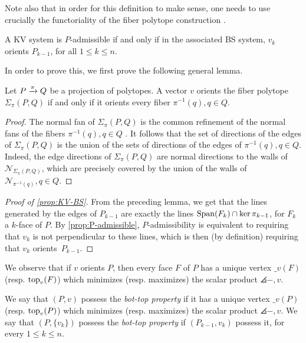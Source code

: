 Note also that in order for this definition to make sense, one needs to use crucially the functoriality of the fiber polytope construction \cite[Lemma 2.3]{BilleraSturmfels92}.

\begin{proposition}
\label{prop:KV-BS}
    A KV system is $P$-admissible if and only if in the associated BS system, $v_k$ orients $P_{k-1}$, for all $1\leq k \leq n$.
\end{proposition}

In order to prove this, we first prove the following general lemma.

\begin{lemma}
    Let $P \xrightarrow{\pi} Q$ be a projection of polytopes. 
    A vector $v$ orients the fiber polytope $\Sigma_\pi(P,Q)$ if and only if it orients every fiber $\pi^{-1}(q), q \in Q$. 
\end{lemma}

\begin{proof}
    The normal fan of $\Sigma_\pi(P,Q)$ is the common refinement of the normal fans of the fibers $\pi^{-1}(q), q \in Q$ \cite[Proposition 2.2]{BilleraSturmfels94}.
    It follows that the set of directions of the edges of $\Sigma_\pi(P,Q)$ is the union of the sets of directions of the edges of $\pi^{-1}(q), q \in Q$. 
    Indeed, the edge directions of $\Sigma_\pi(P,Q)$ are normal directions to the walls of $\mathcal{N}_{\Sigma_\pi(P,Q)}$, which are precisely covered by the union of the walls of $\mathcal{N}_{\pi^{-1}(q)}, q \in Q$. 
\end{proof}

\begin{proof}[Proof of \cref{prop:KV-BS}]
    From the preceding lemma, we get that the lines generated by the edges of $P_{k-1}$ are exactly the lines $\operatorname{\mathrm{Span}}(F_k)\cap \ker \pi_{k-1}$, for $F_k$ a $k$-face of $P$. 
    By \cref{prop:P-admissible}, $P$-admissibility is equivalent to requiring that $v_k$ is not perpendicular to these lines, which is then (by definition) requiring that $v_k$ orients~$P_{k-1}$. 
\end{proof}

We observe that if $v$ orients $P$, then every face $F$ of $P$ has a unique vertex $\bm_v(F)$ (resp. $\operatorname{top}_v(F)$) which minimizes (resp. maximizes) the scalar product $\angles{-,v}$.

\begin{definition}
    We say that $(P,v)$ possess the \emph{bot-top property} if it has a unique vertex $\bm_v(P)$ (resp. $\operatorname{top}_v(P)$) which minimizes (resp. maximizes) the scalar product $\angles{-,v}$.
    We say that $(P,\{v_k\})$ possess the \emph{bot-top property} if $(P_{k-1}, v_k)$ possess it, for every $1\leq k \leq n$.
\end{definition}


